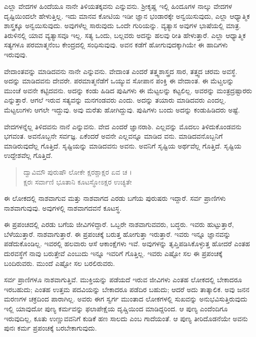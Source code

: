 ಎಲ್ಲಾ ವೇದಗಳ ಹಿಂದೆಯೂ ನಾನೇ ತಿಳಿಯತಕ್ಕವನು ಎನ್ನುವನು. ಶ್ರೀಕೃಷ್ಣ ಇಲ್ಲಿ ಹಿಂದೂಗಳ ನಾಲ್ಕು ವೇದಗಳ ದೃಷ್ಟಿಯಿಂದಲೇ ಹೇಳುತ್ತಿಲ್ಲ. ಇದು ಮಾನವ ಕೋಟಿಯ ಇಡೀ ಜ್ಞಾನ ಭಂಡಾರಕ್ಕೇ ಅನ್ವಯಿಸುವುದು, ಎಲ್ಲಾ ಆಧ್ಯಾತ್ಮಿಕ ಶಾಸ್ತ್ರಕ್ಕೂ ಅನ್ವಯಿಸುವುದು. ಅವುಗಳೆಲ್ಲ ಸಾರುವುದು ಒಂದೇ ಗುರಿಯನ್ನು. ವ್ಯತ್ಯಾಸ ಅವುಗಳ ಭಾಷೆಯಲ್ಲಿ ಮಾತ್ರ. ತಿರುಳಿನಲ್ಲಿ ಯಾವ ವ್ಯತ್ಯಾಸವೂ ಇಲ್ಲ. ಸತ್ಯ ಒಂದು, ಬಲ್ಲವರು ಅದನ್ನು ಹಲವು ರೀತಿ ಹೇಳುತ್ತಾರೆ. ಎಲ್ಲಾ ಆಧ್ಯಾತ್ಮಿಕ ಸತ್ಯಗಳೂ ಪರಮಾತ್ಮನೆಂಬ ಕೇಂದ್ರದಲ್ಲಿ ಸಂಧಿಸುವುವು. ಅವನ ಕಡೆಗೆ ಹೋಗುವುದಕ್ಕಾಗಿಯೇ ಈ ಹಾದಿಗಳು ಇರುವುವು.

ವೇದಾಂತವನ್ನು ಮಾಡಿದವನು ನಾನೇ ಎನ್ನುವನು. ವೇದಾಂತ ಎಂದರೆ ತತ್ತ್ವಶಾಸ್ತ್ರದ ಸಾರ, ತತ್ತ್ವದ ಚರಮ ಅವಸ್ಥೆ. ಅದನ್ನು ಮಾಡಿದವನು ದೇವರೇ. ಪರಮಾತ್ಮನೆಡೆಗೆ ಒಯ್ಯುವ ಸೋಪಾನ ಪಂಕ್ತಿ ಈ ವೇದಾಂತ. ಈ ಮೆಟ್ಚಲನ್ನು ಮುಂಚೆ ಅವನೇ ಕಟ್ಟಿದವನು. ಅದನ್ನು ಕಂಡು ಹಿಡಿದ ಪುಷಿಗಳು ಈ ಮೆಟ್ಟಲನ್ನು ಕಟ್ಟಲಿಲ್ಲ. ಅವರನ್ನು ಮಂತ್ರದ್ರಷ್ಟಾರರು ಎನ್ನುತ್ತಾರೆ. ಆಗಲೆ ಇರುವ ಸತ್ಯವನ್ನು ಮನಗಂಡವರು ಎಂದು. ಅದನ್ನು ತಯಾರು ಮಾಡಿದವರು ಎಂದಲ್ಲ. ಮೆಟ್ಟಲುಗಳು ಆಗಲೇ ಇದ್ದುವು. ಅವು ಮರೆತು ಹೋಗಿದ್ದುವು. ಪುಷಿಗಳು ಬಂದು ಅದನ್ನು ಕಂಡುಹಿಡಿದರು ಅಷ್ಟೆ.

ವೇದಗಳನ್ನೆಲ್ಲ ತಿಳಿದವನು ನಾನೆ ಎನ್ನುವನು. ವೇದ ಎಂದರೆ ಜ್ಞಾನರಾಶಿ. ಎಲ್ಲವನ್ನು ಮೊದಲು ತಿಳಿದುಕೊಂಡವನು ಭಗವಂತ. ಅವನೊಬ್ಬನೇ ಸರ್ವಜ್ಞ. ಏಕೆಂದರೆ ಅವನೇ ಎಲ್ಲವನ್ನೂ ಮಾಡಿದ ವನು. ಮಾಡಿದವನೊಬ್ಬನಿಗೆ ಮಾಡಿರುವುದೆಲ್ಲ ಗೊತ್ತಿದೆ. ಸೃಷ್ಟಿಯನ್ನು ಮಾಡಿದವನು ಅವನು. ಅವನಿಗೆ ಸೃಷ್ಟಿಯ ಅರ್ಥವೆಲ್ಲ ಗೊತ್ತಿದೆ. ಸೃಷ್ಟಿಯ ಉದ್ದೇಶವೆಲ್ಲ ಗೊತ್ತಿದೆ.

\begin{verse}
ದ್ವಾವಿಮೌ ಪುರುಷೌ ಲೋಕೇ ಕ್ಷರಶ್ಚಾಕ್ಷರ ಏವ ಚ ।\\ಕ್ಷರಃ ಸರ್ವಾಣಿ ಭೂತಾನಿ ಕೂಟಸ್ಥೋಽಕ್ಷರ ಉಚ್ಯತೇ 
\end{verse}

{\small ಈ ಲೋಕದಲ್ಲಿ ನಾಶವಾಗುವ ಮತ್ತು ನಾಶವಾಗದ ಎರಡು ಬಗೆಯ ಪುರುಷರು ಇದ್ದಾರೆ. ಸರ್ವ ಪ್ರಾಣಿಗಳು ನಾಶವಾಗುವುವು. ಅವುಗಳಲ್ಲಿ ನಾಶವಾಗದವನೆ ಕೂಟಸ್ಥ.}

ಈ ಪ್ರಪಂಚದಲ್ಲಿ ಎರಡು ಬಗೆಯ ಜೀವಿಗಳಿದ್ದಾರೆ. ಒಬ್ಬರೇ ನಾಶವಾಗುವವರು, ಬದ್ಧರು. ಇವರು ಹುಟ್ಟುತ್ತಾರೆ, ಬೆಳೆಯುತ್ತಾರೆ. ನಾಶವಾಗುತ್ತಾರೆ. ಈ ಪ್ರಪಂಚಕ್ಕೆ ಬರುತ್ತ ಹೋಗುತ್ತಾ ಇರುತ್ತಾರೆ. ಇವರು ಇನ್ನೂ ಜ್ಞಾನವನ್ನು ಪಡೆದುಕೊಂಡಿಲ್ಲ. ಇವರಲ್ಲಿ ಹಲವಾರು ಆಸೆ ಆಕಾಂಕ್ಷೆಗಳು ಇವೆ. ಅವುಗಳನ್ನು ತೃಪ್ತಿಪಡಿಸಿಕೊಳ್ಳುತ್ತ ಹೋದರೆ ಎಂತಹ ದುರವಸ್ಥೆಗೆ ನಾವು ಬರುತ್ತೇವೆ ಎಂಬುದು ಇನ್ನೂ ಇವರಿಗೆ ಗೊತ್ತಿಲ್ಲ. ಇವರು ಎಷ್ಟೋ ಸಲ ಈ ಪ್ರಪಂಚಕ್ಕೆ ಬಂದಿರುವರು. ಮುಂದೆ ಎಷ್ಟೋ ಸಲ ಬರಲಿರುವರು.

ಸರ್ವ ಪ್ರಾಣಿಗಳೂ ನಾಶವಾಗುತ್ತಿವೆ. ಮುಕ್ತಿಯನ್ನು ಪಡೆಯದೆ ಇರುವ ಜೀವಿಗಳು ಎಂತಹ ಲೋಕದಲ್ಲಿ ಬೇಕಾದರೂ ಇರಬಹುದು; ಎಂತಹ ಉತ್ತಮ ಪದವಿಯನ್ನು ಬೇಕಾದರೂ ಪಡೆದಿರ ಬಹುದು; ಆದರೆ ಅದು ತಾತ್ಕಾಲಿಕ. ಅವು ಜನನ ಮರಣಗಳ ಚಕ್ರದಿಂದ ಪಾರಾಗಿಲ್ಲ. ಅವರು ಈಗ ಸ್ವರ್ಗ ಮುಂತಾದ ಲೋಕಗಳಲ್ಲಿ ಸುಖವನ್ನು ಅನುಭವಿಸುತ್ತಿರುವುದು ಇಲ್ಲಿ ಯಾವುದೋ ಪುಣ್ಯ ಕರ್ಮವನ್ನು ಫಲಾಪೇಕ್ಷೆಯ ದೃಷ್ಚಿಯಿಂದ ಮಾಡಿದ್ದರಿಂದ. ಆ ಪುಣ್ಯ ಎಂದೆಂದಿಗೂ ಇರುವುದಿಲ್ಲ, ಕೂತು ಉಣ್ಣುವವನಿಗೆ ಕುಡಿಕೆ ಹಣ ಸಾಲದು ಎಂಬ ಗಾದೆಯಂತೆ. ಆ ಪುಣ್ಯ ತೀರಿದೊಡನೆಯೇ ಅವನು ಪುನಃ ಕರ್ಮ ಪ್ರಪಂಚಕ್ಕೆ ಬರಬೇಕಾಗುವುದು.

